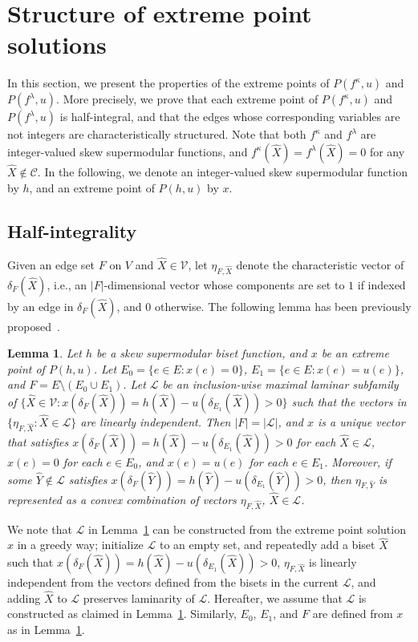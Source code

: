\documentclass{article}
\newtheorem{lemma}{Lemma}
\newcommand{\Cfam}{\mathcal{C}}
\newcommand{\Vfam}{\mathcal{V}}
\newcommand{\Lfam}{\mathcal{L}}
\newcommand{\cut}{P}
\newcommand{\f}{f^{\kappa}}
\newcommand{\g}{f^{\lambda}}
\begin{document}
\section{Structure of extreme point solutions}
\label{sec:characterization}

In this section, we present the properties of the extreme points of $\cut(\f,u)$ and $\cut(\g,u)$.
More precisely, we prove that each extreme point of $\cut(\f,u)$ and $\cut(\g,u)$ is half-integral,
and that the edges whose corresponding variables are not integers are characteristically structured.
Note that both $\f$ and $\g$ are integer-valued skew supermodular functions, and 
$\f(\hat{X})=\g(\hat{X}) = 0$
for any $\hat{X} \not\in \Cfam$. 
In the following, we denote an integer-valued skew supermodular function by $h$,
and an extreme point of $\cut(h,u)$ by $x$.


\subsection{Half-integrality} 

Given an edge set $F$ on $V$ and $\hat{X} \in \Vfam$, let $\eta_{F,\hat{X}}$ denote the characteristic
vector of $\delta_F(\hat{X})$,
i.e., an $|F|$-dimensional vector whose components are set to $1$ if indexed by
an edge in $\delta_F(\hat{X})$, and $0$ otherwise.
The following lemma has been previously proposed~\cite{Cheriyan2006,FleischerJW06}.

\begin{lemma}\label{lem.terminal-laminar}
Let $h$ be a skew supermodular biset function, 
and $x$ be an extreme point of $\cut(h,u)$.
Let $E_0=\{e \in E \colon x(e)=0\}$,
$E_1=\{e \in E \colon x(e)=u(e)\}$, and
$F=E \setminus (E_0 \cup E_1)$. 
Let $\Lfam$ be an inclusion-wise maximal laminar subfamily
of $\{\hat{X} \in \Vfam \colon x(\delta_F(\hat{X}))=h(\hat{X})-u(\delta_{E_1}(\hat{X}))>0\}$
such that the vectors in $\{\eta_{F,\hat{X}}\colon \hat{X} \in \Lfam\}$
are linearly independent. Then
$|F|=|\Lfam|$,
and $x$ is a unique vector that satisfies
$x(\delta_F(\hat{X}))=h(\hat{X})-u(\delta_{E_1}(\hat{X}))>0$ for each $\hat{X} \in \Lfam$,
 $x(e)=0$ for each $e \in E_0$, and $x(e)=u(e)$ for each $e \in E_1$.
 Moreover, if some $\hat{Y} \not\in \Lfam$  satisfies
 $x(\delta_F(\hat{Y}))=h(\hat{Y})-u(\delta_{E_1}(\hat{Y}))>0$,
 then $\eta_{F,\hat{Y}}$ is represented as a convex combination of vectors 
 $\eta_{F,\hat{X}}$,  $\hat{X} \in \Lfam$.
\end{lemma}

We note that $\Lfam$ in Lemma~\ref{lem.terminal-laminar} can be
constructed from the extreme point solution $x$ in a greedy
way;
initialize $\Lfam$ to an empty set, and repeatedly add a biset $\hat{X}$
such that $x(\delta_F(\hat{X}))=h(\hat{X})-u(\delta_{E_1}(\hat{X}))>0$, $\eta_{F,\hat{X}}$ is linearly independent from the 
vectors defined from the bisets in the current $\Lfam$, and adding $\hat{X}$ to $\Lfam$ preserves
laminarity of $\Lfam$.
Hereafter, we assume that $\Lfam$ is constructed as claimed in Lemma~\ref{lem.terminal-laminar}.
Similarly, 
$E_0$, $E_1$, and $F$ are defined from $x$ as in Lemma~\ref{lem.terminal-laminar}.
\end{document}
